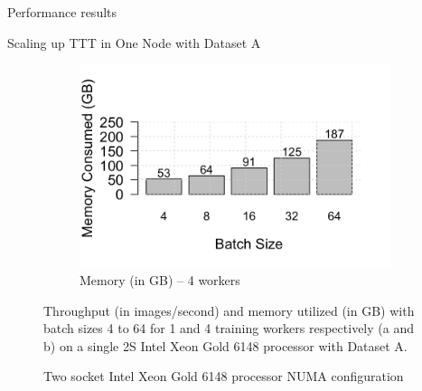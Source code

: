 \begin{section}{Performance results}
\begin{subsection}{Scaling up TTT in One Node with Dataset A}
\begin{figure}[t]
\begin{subfigure}[t]{0.45\textwidth}
				\includegraphics[width=\textwidth]{wgrid_figure3d.png}
				\caption{Memory (in GB) -- 4 workers}
				\label{fig:singlenodememutil4w}
			\end{subfigure}
			\caption{\label{fig:multiworker}
				\textsf{Throughput (in images/second) and memory utilized (in GB) with batch sizes 4 to 64 for 1 and 4 training workers respectively (a and b) on a single 2S Intel\textregistered{} Xeon\textregistered{} Gold 6148 processor with Dataset A.}}
		\end{figure}

		\begin{figure}[h!]
			\centering
			\caption{\textsf{Two socket Intel\textregistered{} Xeon\textregistered{} Gold 6148 processor NUMA configuration}}
			\label{fig:multisocket}
		\end{figure}
	

\end{subsection}
\end{section}

